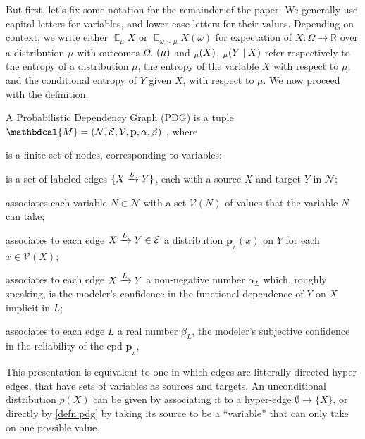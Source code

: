 \documentclass{article}
\theoremstyle{plain}
\theoremstyle{definition}
\let\H\relax
\DeclareMathOperator{\H}{\mathrm{H}} %
\DeclareMathOperator*{\Ex}{\mathbb{E}} %
\newcommand{\mat}[1]{\mathbf{#1}}
\newcommand{\bp}[1][L]{\mat{p}_{\!_{#1}\!}}
\newcommand{\V}{\mathcal V}
\newcommand{\N}{\mathcal N}
\newcommand{\Ed}{\mathcal E}
\newcommand{\dg}[1]{\mathbdcal{#1}}
\newcommand{\ed}[3]{%
		\mathchoice%
		{#2\overset{\smash{\mskip-5mu\raisebox{-3pt}{${#1}$}}}{\xrightarrow{\hphantom{\scriptstyle {#1}}}} #3} %
		{#2\overset{\smash{\mskip-5mu\raisebox{-3pt}{$\scriptstyle {#1}$}}}{\xrightarrow{\hphantom{\scriptstyle {#1}}}} #3}%
		{#2\overset{\smash{\mskip-5mu\raisebox{-3pt}{$\scriptscriptstyle {#1}$}}}{\xrightarrow{\hphantom{\scriptscriptstyle {#1}}}} #3} %
		{#2\overset{\smash{\mskip-5mu\raisebox{-3pt}{$\scriptscriptstyle {#1}$}}}{\xrightarrow{\hphantom{\scriptscriptstyle {#1}}}} #3}} %
\begin{document}
But first, let's fix some notation for the remainder of the paper.
We generally use capital letters for variables, and lower case letters for their values.
Depending on context, we write either $\Ex_\mu X$ or $\Ex_{\omega \sim \mu} X(\omega)$ for expectation of $X : \Omega \to \mathbb R$ over a distribution $\mu$ with outcomes $\Omega$.
$\H(\mu)$ and $\H_\mu(X)$, $\H_\mu(Y \mid X)$ refer respectively to the entropy of a distribution $\mu$, the entropy of the variable $X$ with respect to $\mu$, and the conditional entropy of $Y$ given $X$, with respect to $\mu$. 
We now proceed with the definition.

\begin{defn}\label{defn:pdg}
	A Probabilistic Dependency Graph (PDG) is a tuple $\dg M = (\N,\Ed,\V,\mat p, \alpha, \beta)$ , where
	\begin{description}[leftmargin=1em,labelindent=1.5em,itemsep=0pt]
		\item[$\N$]
			is a finite set of nodes, corresponding to variables;
		\item[$\Ed$]
			is a set of labeled  edges $\{ \ed LXY \}$, each with a source
			$X$ and target $Y$ in $\N$;
		\item[$\V$]
			associates each variable $N \in \N$ with a set $\V(N)$ of values that the variable $N$ can take;
		\item[$\mat p$]
		associates to each edge $\ed LXY \in \Ed$
		a distribution $\bp(x)$ on $Y$ for each $x \in \V(X)$;
	\item[$\alpha$]
	associates to each edge $\ed LXY$ a non-negative number $\alpha_L$ which,
	roughly speaking, is the modeler's confidence in the functional
	dependence of $Y$ on $X$ implicit in $L$;
	\item[$\beta$]
	associates to each edge $L$ a real number $\beta_L$,
	the modeler's subjective confidence in the reliability of
	the cpd 
	$\bp$, 
	
	\end{description}
\end{defn}

This presentation is equivalent to one in which edges are litterally directed hyper-edges, that have sets of variables as sources and targets.
An unconditional distribution $p(X)$ can be given by associating it to a hyper-edge $\emptyset \to \{X\}$, or directly by \cref{defn:pdg} by taking its source to be a ``variable'' that can only take on one possible value.
\end{document}
